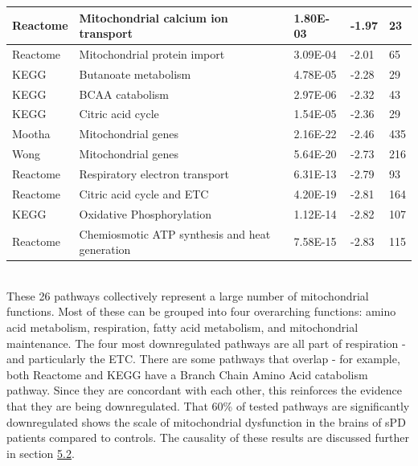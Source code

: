 \documentclass{article}
\begin{document}
\begin{table}[h]
\begin{tabular}{|l|l|l|l|l|}
Reactome       & Mitochondrial calcium ion transport            & 1.80E-03 & -1.97 & 23           \\ \hline
Reactome       & Mitochondrial protein import                   & 3.09E-04 & -2.01 & 65           \\ \hline
KEGG           & Butanoate metabolism                           & 4.78E-05 & -2.28 & 29           \\ \hline
KEGG           & BCAA catabolism                                & 2.97E-06 & -2.32 & 43           \\ \hline
KEGG           & Citric acid cycle                              & 1.54E-05 & -2.36 & 29           \\ \hline
Mootha         & Mitochondrial genes                            & 2.16E-22 & -2.46 & 435          \\ \hline
Wong           & Mitochondrial genes                            & 5.64E-20 & -2.73 & 216          \\ \hline
Reactome       & Respiratory electron transport                 & 6.31E-13 & -2.79 & 93           \\ \hline
Reactome       & Citric acid cycle and ETC                      & 4.20E-19 & -2.81 & 164          \\ \hline
KEGG           & Oxidative Phosphorylation                      & 1.12E-14 & -2.82 & 107          \\ \hline
Reactome       & Chemiosmotic ATP synthesis and heat generation & 7.58E-15 & -2.83 & 115          \\ \hline
\end{tabular}
\end{table}
\\These 26 pathways collectively represent a large number of mitochondrial functions. Most of these can be grouped into four overarching functions: amino acid metabolism, respiration, fatty acid metabolism, and mitochondrial maintenance. The four most downregulated pathways are all part of respiration - and particularly the ETC. There are some pathways that overlap - for example, both Reactome and KEGG have a Branch Chain Amino Acid catabolism pathway. Since they are concordant with each other, this reinforces the evidence that they are being downregulated. That 60\% of tested pathways are significantly downregulated shows the scale of mitochondrial dysfunction in the brains of sPD patients compared to controls. The causality of these results are discussed further in section
\hyperref[subsubsec:causality]{5.2}.
\end{document}
